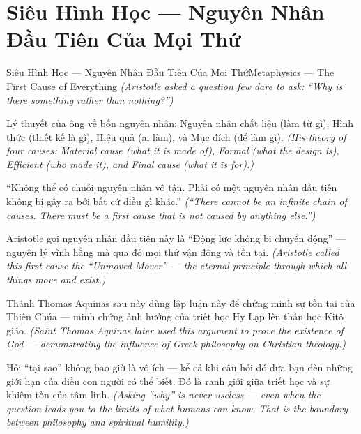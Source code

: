 \section{Siêu Hình Học — Nguyên Nhân Đầu Tiên Của Mọi Thứ}
\begin{truyen}{Siêu Hình Học — Nguyên Nhân Đầu Tiên Của Mọi Thứ}{Metaphysics — The First Cause of Everything}
\textit{(Aristotle asked a question few dare to ask: ``Why is there something rather than nothing?'')}

Lý thuyết của ông về bốn nguyên nhân: Nguyên nhân chất liệu (làm từ gì), Hình thức (thiết kế là gì), Hiệu quả (ai làm), và Mục đích (để làm gì).
\textit{(His theory of four causes: Material cause (what it is made of), Formal (what the design is), Efficient (who made it), and Final cause (what it is for).)}

``Không thể có chuỗi nguyên nhân vô tận. Phải có một nguyên nhân đầu tiên không bị gây ra bởi bất cứ điều gì khác.''
\textit{(``There cannot be an infinite chain of causes. There must be a first cause that is not caused by anything else.'')}

Aristotle gọi nguyên nhân đầu tiên này là ``Động lực không bị chuyển động'' — nguyên lý vĩnh hằng mà qua đó mọi thứ vận động và tồn tại.
\textit{(Aristotle called this first cause the ``Unmoved Mover'' — the eternal principle through which all things move and exist.)}

Thánh Thomas Aquinas sau này dùng lập luận này để chứng minh sự tồn tại của Thiên Chúa — minh chứng ảnh hưởng của triết học Hy Lạp lên thần học Kitô giáo.
\textit{(Saint Thomas Aquinas later used this argument to prove the existence of God — demonstrating the influence of Greek philosophy on Christian theology.)}

\end{truyen}

\begin{baihoc}
Hỏi ``tại sao'' không bao giờ là vô ích — kể cả khi câu hỏi đó đưa bạn đến những giới hạn của điều con người có thể biết. Đó là ranh giới giữa triết học và sự khiêm tốn của tâm linh.
\textit{(Asking ``why'' is never useless — even when the question leads you to the limits of what humans can know. That is the boundary between philosophy and spiritual humility.)}
\end{baihoc}
\ngancach


